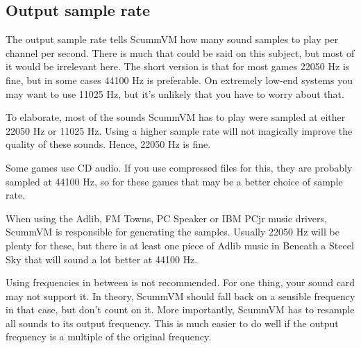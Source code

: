 
\subsection{Output sample rate}

The output sample rate tells ScummVM how many sound samples to play per channel
per second. There is much that could be said on this subject, but most of it
would be irrelevant here. The short version is that for most games 22050 Hz is
fine, but in some cases 44100 Hz is preferable. On extremely low-end systems
you may want to use 11025 Hz, but it's unlikely that you have to worry about
that.

To elaborate, most of the sounds ScummVM has to play were sampled at either
22050 Hz or 11025 Hz. Using a higher sample rate will not magically improve the
quality of these sounds. Hence, 22050 Hz is fine.

Some games use CD audio. If you use compressed files for this, they are
probably sampled at 44100 Hz, so for these games that may be a better choice of
sample rate.

When using the Adlib, FM Towns, PC Speaker or IBM PCjr music drivers, ScummVM
is responsible for generating the samples. Usually 22050 Hz will be plenty for
these, but there is at least one piece of Adlib music in Beneath a Steeel Sky
that will sound a lot better at 44100 Hz.

Using frequencies in between is not recommended. For one thing, your sound card
may not support it. In theory, ScummVM should fall back on a sensible frequency
in that case, but don't count on it. More importantly, ScummVM has to resample
all sounds to its output frequency. This is much easier to do well if the
output frequency is a multiple of the original frequency.
